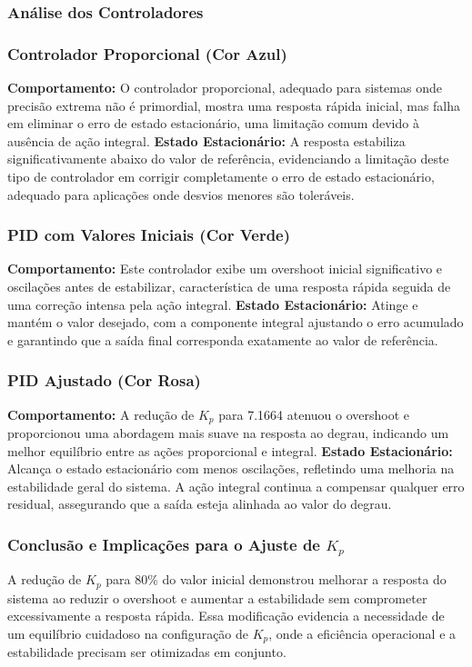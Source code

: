 \subsubsection{Análise dos Controladores}

\subsubsection{Controlador Proporcional (Cor Azul)}
\textbf{Comportamento:} O controlador proporcional, adequado para sistemas onde precisão extrema não é primordial, mostra uma resposta rápida inicial, mas falha em eliminar o erro de estado estacionário, uma limitação comum devido à ausência de ação integral.
\textbf{Estado Estacionário:} A resposta estabiliza significativamente abaixo do valor de referência, evidenciando a limitação deste tipo de controlador em corrigir completamente o erro de estado estacionário, adequado para aplicações onde desvios menores são toleráveis.

\subsubsection{PID com Valores Iniciais (Cor Verde)}
\textbf{Comportamento:} Este controlador exibe um overshoot inicial significativo e oscilações antes de estabilizar, característica de uma resposta rápida seguida de uma correção intensa pela ação integral.
\textbf{Estado Estacionário:} Atinge e mantém o valor desejado, com a componente integral ajustando o erro acumulado e garantindo que a saída final corresponda exatamente ao valor de referência.

\subsubsection{PID Ajustado (Cor Rosa)}
\textbf{Comportamento:} A redução de \(K_p\) para 7.1664 atenuou o overshoot e proporcionou uma abordagem mais suave na resposta ao degrau, indicando um melhor equilíbrio entre as ações proporcional e integral.
\textbf{Estado Estacionário:} Alcança o estado estacionário com menos oscilações, refletindo uma melhoria na estabilidade geral do sistema. A ação integral continua a compensar qualquer erro residual, assegurando que a saída esteja alinhada ao valor do degrau.

\subsubsection{Conclusão e Implicações para o Ajuste de \(K_p\)}
A redução de \(K_p\) para 80\% do valor inicial demonstrou melhorar a resposta do sistema ao reduzir o overshoot e aumentar a estabilidade sem comprometer excessivamente a resposta rápida. Essa modificação evidencia a necessidade de um equilíbrio cuidadoso na configuração de \(K_p\), onde a eficiência operacional e a estabilidade precisam ser otimizadas em conjunto.

